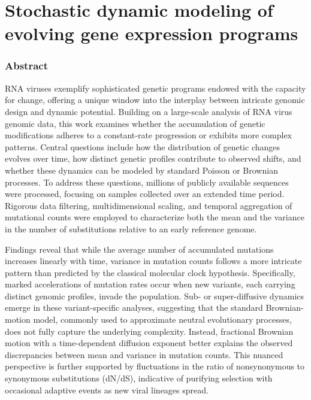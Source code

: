 \chapter*{\Large Stochastic dynamic modeling of evolving gene expression programs}

\vspace{-1cm}

\subsection*{\myself}

\subsection*{Abstract}
RNA viruses exemplify sophisticated genetic programs endowed with the capacity for change, offering a unique window into the interplay between intricate genomic design and dynamic potential. Building on a large-scale analysis of RNA virus genomic data, this work examines whether the accumulation of genetic modifications adheres to a constant-rate progression or exhibits more complex patterns. Central questions include how the distribution of genetic changes evolves over time, how distinct genetic profiles contribute to observed shifts, and whether these dynamics can be modeled by standard Poisson or Brownian processes. To address these questions, millions of publicly available sequences were processed, focusing on samples collected over an extended time period. Rigorous data filtering, multidimensional scaling, and temporal aggregation of mutational counts were employed to characterize both the mean and the variance in the number of substitutions relative to an early reference genome.

Findings reveal that while the average number of accumulated mutations increases linearly with time, variance in mutation counts follows a more intricate pattern than predicted by the classical molecular clock hypothesis. Specifically, marked accelerations of mutation rates occur when new variants, each carrying distinct genomic profiles, invade the population. Sub- or super-diffusive dynamics emerge in these variant-specific analyses, suggesting that the standard Brownian-motion model, commonly used to approximate neutral evolutionary processes, does not fully capture the underlying complexity. Instead, fractional Brownian motion with a time-dependent diffusion exponent better explains the observed discrepancies between mean and variance in mutation counts. This nuanced perspective is further supported by fluctuations in the ratio of nonsynonymous to synonymous substitutions (dN/dS), indicative of purifying selection with occasional adaptive events as new viral lineages spread.

